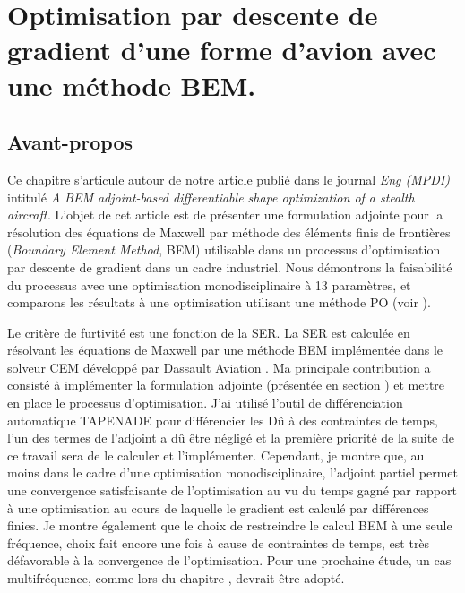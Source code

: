 \chapter{Optimisation par descente de gradient d'une forme d'avion avec une méthode BEM.}
\label{ch:chapter3}


\section*{Avant-propos}
\label{sec:ch3-avantpropos}
Ce chapitre s'articule autour de notre article publié dans le journal \textit{Eng (MPDI)} intitulé \textit{A BEM adjoint-based differentiable shape optimization of a stealth aircraft.} L'objet de cet article est de présenter une formulation adjointe pour la résolution des équations de Maxwell par méthode des éléments finis de frontières (\textit{Boundary Element Method}, BEM) utilisable dans un processus d'optimisation par descente de gradient dans un cadre industriel. Nous démontrons la faisabilité du processus avec une optimisation monodisciplinaire à 13 paramètres, et comparons les résultats à une optimisation utilisant une méthode PO (voir \textit{}).

Le critère de furtivité est une fonction de la SER. La SER est calculée en résolvant les équations de Maxwell par une méthode BEM implémentée dans le solveur CEM développé par Dassault Aviation \citep{Poggio1970}. Ma principale contribution a consisté à implémenter la formulation adjointe (présentée en section \textit{}) et mettre en place le processus d'optimisation. J'ai utilisé l'outil de différenciation automatique TAPENADE \citep{Hascoet2013} pour différencier les  Dû à des contraintes de temps, l'un des termes de l'adjoint a dû être négligé et la première priorité de la suite de ce travail sera de le calculer et l'implémenter. Cependant, je montre que, au moins dans le cadre d'une optimisation monodisciplinaire, l'adjoint partiel permet une convergence satisfaisante de l'optimisation au vu du temps gagné par rapport à une optimisation au cours de laquelle le gradient est calculé par différences finies. Je montre également que le choix de restreindre le calcul BEM à une seule fréquence, choix fait encore une fois à cause de contraintes de temps, est très défavorable à la convergence de l'optimisation. Pour une prochaine étude, un cas multifréquence, comme lors du chapitre \textit{}, devrait être adopté.

